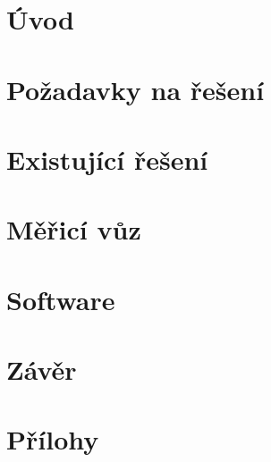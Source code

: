 \documentclass[digital, oneside, table, nolot, nolof]{fithesis3}
\begin{document}

\setlength{\parindent}{0cm}
\setlength{\parskip}{3mm plus2pt minus2pt}
\renewenvironment{compactenum}
	{\begin{enumerate}[leftmargin=8mm,itemsep=0pt,parsep=1pt,topsep=1pt,partopsep=1pt]}
	{\end{enumerate}}
\renewenvironment{compactitem}
	{\begin{itemize}[leftmargin=8mm,itemsep=0pt,parsep=0pt,topsep=1pt,partopsep=1pt]}
	{\end{itemize}}

\chapter{Úvod} \label{chap:uvod}


\chapter{Požadavky na řešení} \label{chap:pozadavky}


\chapter{Existující řešení} \label{chap:prehled}


\chapter{Měřicí vůz} \label{chap:merici-vuz}


\chapter{Software} \label{chap:sw}


\chapter{Závěr} \label{chap:zaver}


\printbibliography[heading=bibintoc]

\appendix
\chapter{Přílohy} \label{chap:appendix}

\end{document}
